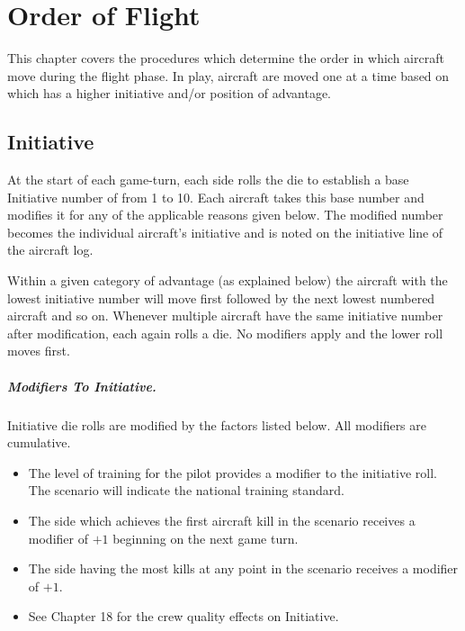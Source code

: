 \chapter
{Order of Flight}

This chapter covers the procedures which determine the order in which aircraft move during the flight phase. In play, aircraft are moved one at a time based on which has a higher initiative and/or position of advantage.

\section
{Initiative}

At the start of each game-turn, each side rolls the die to establish a base Initiative number of from 1 to 10. Each aircraft takes this base number and modifies it for any of the applicable reasons given below. The modified number becomes the individual aircraft's initiative and is noted on the initiative line of the aircraft log.

Within a given category of advantage (as explained below) the aircraft with the lowest initiative number will move first followed by the next lowest numbered aircraft and so on. Whenever multiple aircraft have the same initiative number after modification, each again rolls a die. No modifiers apply and the lower roll moves first.

\paragraph{Modifiers To Initiative.} Initiative die rolls are modified by the factors listed below. All modifiers are cumulative.


\begin{itemize}

    \item{} The level of training for the pilot provides a modifier to the initiative roll. The scenario will indicate the national training standard.

    \item{} The side which achieves the first aircraft kill in the scenario receives a modifier of $+1$ beginning on the next game turn.

    \item{} The side having the most kills at any point in the scenario receives a modifier of $+1$.

    \item{} See Chapter 18 for the crew quality effects on Initiative.
\end{itemize}

